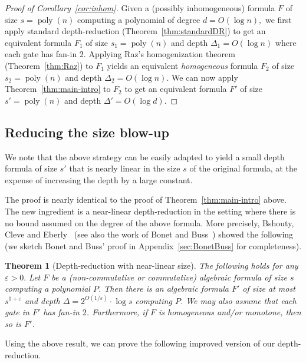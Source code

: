 \documentclass[11pt,a4paper]{article}
\newtheorem{theorem}{Theorem}
\newcommand{\poly}{\mathop{\mathrm{poly}}}
\begin{document}
\begin{proof}[Proof of Corollary~\ref{cor:inhom}]
	Given a (possibly inhomogeneous) formula $F$ of size $s = \poly(n)$ computing a polynomial of degree $d = O(\log n),$ we first apply standard depth-reduction (Theorem~\ref{thm:standardDR}) to get an equivalent formula $F_1$ of size $s_1 = \poly(n)$ and depth $\Delta_1 = O(\log n)$ where each gate has fan-in $2$. Applying Raz's homogenization theorem (Theorem~\ref{thm:Raz}) to $F_1$ yields an equivalent \emph{homogeneous} formula $F_2$ of size $s_2 = \poly(n)$ and depth $\Delta_2 = O(\log n)$. We can now apply Theorem~\ref{thm:main-intro} to $F_2$ to get an equivalent formula $F'$ of size $s' = \poly(n)$ and depth $\Delta' = O(\log d).$
\end{proof}


\subsection{Reducing the size blow-up}
\label{sec:nearlinear}



We note that the above strategy can be easily adapted to yield a small depth formula of size $s'$ that is nearly linear in the size $s$ of the original formula, at the expense of increasing the depth by a large constant. 

The proof is nearly identical to the proof of Theorem~\ref{thm:main-intro} above. The new ingredient is a near-linear depth-reduction in the setting where there is no bound assumed on the degree of the above formula. More precisely, Bshouty, Cleve and Eberly~\cite{BCE} (see also the work of Bonet and Buss~\cite{BonetBuss}) showed the following (we sketch Bonet and Buss' proof in Appendix~\ref{sec:BonetBuss} for completeness).

\begin{theorem}[Depth-reduction with near-linear size]
	\label{thm:BCE}
	The following holds for any $\varepsilon > 0.$ Let $F$ be a (non-commutative or commutative) algebraic formula of size $s$ computing a polynomial $P$. Then there is an algebraic formula $F'$ of size at most $s^{1+\varepsilon}$ and depth $\Delta = 2^{O(1/\varepsilon)}\cdot \log s$ computing $P$. We may also assume that each gate in $F'$ has fan-in $2$. Furthermore, if $F$ is homogeneous and/or monotone, then so is $F'$.
\end{theorem}

Using the above result, we can prove the following improved version of our depth-reduction.  
\end{document}
